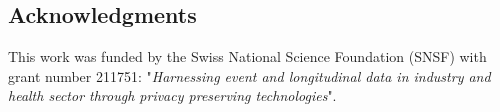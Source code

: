 \documentclass[a0,portrait]{a0poster}
\begin{document}
\begin{multicols}{3}
\subsection{\textsuperscript{}Acknowledgments}
\label{Acknowledgments}

\normalsize
This work was funded by the Swiss National Science Foundation (SNSF) with grant number 211751: "\textit{Harnessing event and longitudinal data in industry and health sector through privacy preserving technologies}".










\end{multicols}
\end{document}
